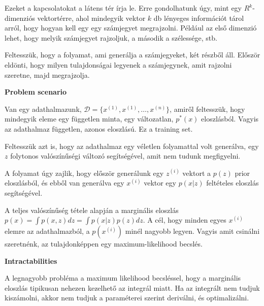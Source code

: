 \documentclass[12pt]{amsart}
\begin{document}
Ezeket a kapcsolatokat a látens tér írja le. Erre
gondolhatunk úgy, mint egy $R^k$-dimenziós vektortérre, ahol
mindegyik vektor $k$ db lényeges információt tárol arról, hogy
hogyan kell egy egy számjegyet megrajzolni. Például az első
dimenzió lehet, hogy melyik számjegyet rajzoljuk, a második
a szélessége, stb.

\vspace{5pt}

Feltesszük, hogy a folyamat, ami generálja a számjegyeket,
két részből áll. Először eldönti, hogy milyen tulajdonságai
legyenek a számjegynek, amit rajzolni szeretne, majd
megrajzolja.

\vspace{10pt}

\noindent
\textbf{Problem scenario}

\vspace{10pt}

Van egy adathalmazunk,
$\mathcal{D} =\{ x^{(1)}, x^{(1)}, \dots, x^{(n)}\}$, amiről
feltesszük, hogy mindegyik eleme egy független minta, egy
változatlan, $p^*(x)$ eloszlásból. Vagyis az adathalmaz
független, azonos eloszlású. Ez a training set. 

\vspace{5pt}

Feltesszük azt is, hogy az adathalmaz egy véletlen
folyamattal volt generálva, egy $z$ folytonos valószínűségi
változó segítségével, amit nem tudunk megfigyelni.

\vspace{5pt}

A folyamat úgy zajlik, hogy először generálunk egy $z^{(i)}$
vektort a $p(z)$ prior eloszlásból, és ebből van generálva
egy $x^{(i)}$ vektor egy $p(x|z)$ feltételes eloszlás
segítségével.

\vspace{5pt}

A teljes valószínűség tétele alapján a marginális eloszlás
$p(x) = \int p(x,z) dz = \int p(x|z)p(z) dz$. A cél, hogy
minden egyes $x^{(i)}$ elemre az adathalmazból, a
$p(x^{(i)})$ minél nagyobb legyen. Vagyis amit csinálni
szeretnénk, az tulajdonképpen egy maximum-likelihood
becslés.

\vspace{10pt}

\noindent
\textbf{Intractabilities}

\vspace{10pt}

A legnagyobb probléma a maximum likelihood becsléssel, hogy
a marginális eloszlás tipikusan nehezen kezelhető az
integrál miatt. Ha az integrált nem tudjuk kiszámolni, akkor
nem tudjuk a paraméterei szerint deriválni, és
optimalizálni.
\end{document}
